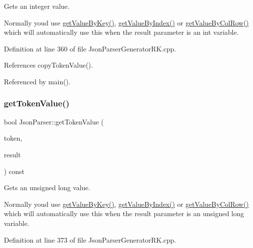 Gets an integer value. 

Normally you\textquotesingle{}d use \hyperlink{class_json_parser_a13abcdcb2341f65ac358bb4d81007d06}{get\+Value\+By\+Key()}, \hyperlink{class_json_parser_a53bd8a6ebb0d9b246b876653e792368f}{get\+Value\+By\+Index()} or \hyperlink{class_json_parser_af1f4a3a65b5cc9cd19b129c410aa78e0}{get\+Value\+By\+Col\+Row()} which will automatically use this when the result parameter is an int variable. 

Definition at line 360 of file Json\+Parser\+Generator\+R\+K.\+cpp.



References copy\+Token\+Value().



Referenced by main().

\mbox{\label{class_json_parser_ad6289b63a2281dc516e4a81aa3660ac7}} 
\subsubsection{\texorpdfstring{get\+Token\+Value()}{getTokenValue()}\hspace{0.1cm}{\footnotesize\ttfamily [3/8]}}
{\footnotesize\ttfamily bool Json\+Parser\+::get\+Token\+Value (\begin{DoxyParamCaption}\item[{const \hyperlink{struct_json_parser_generator_r_k_1_1jsmntok__t}{Json\+Parser\+Generator\+R\+K\+::jsmntok\+\_\+t} $\ast$}]{token,  }\item[{unsigned long \&}]{result }\end{DoxyParamCaption}) const}



Gets an unsigned long value. 

Normally you\textquotesingle{}d use \hyperlink{class_json_parser_a13abcdcb2341f65ac358bb4d81007d06}{get\+Value\+By\+Key()}, \hyperlink{class_json_parser_a53bd8a6ebb0d9b246b876653e792368f}{get\+Value\+By\+Index()} or \hyperlink{class_json_parser_af1f4a3a65b5cc9cd19b129c410aa78e0}{get\+Value\+By\+Col\+Row()} which will automatically use this when the result parameter is an unsigned long variable. 

Definition at line 373 of file Json\+Parser\+Generator\+R\+K.\+cpp.



